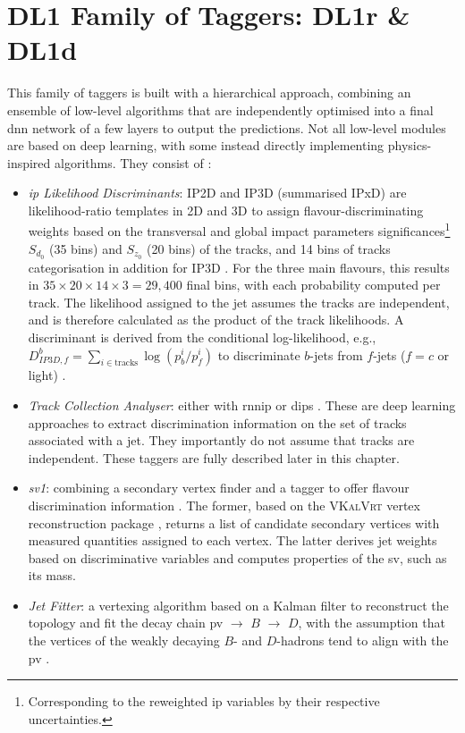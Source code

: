 \section{DL1 Family of Taggers: DL1r \& DL1d}
This family of taggers is built with a hierarchical approach, combining an ensemble of low-level algorithms that are independently optimised into a final \gls{dnn} network of a few layers to output the predictions. Not all low-level modules are based on deep learning, with some instead directly implementing physics-inspired algorithms. They consist of \cite{atlas:FTAGRUN2, Paganini:2289214}:
\begin{itemize}
  \item \textit{\gls{ip} Likelihood Discriminants}: IP2D and IP3D (summarised IPxD) are likelihood-ratio templates in 2D and 3D to assign flavour-discriminating weights based on the transversal and global impact parameters significances\footnote{Corresponding to the reweighted \gls{ip} variables by their respective uncertainties.} $S_{d_0}$ (35 bins) and $S_{z_0}$ (20 bins) of the tracks, and 14 bins of tracks categorisation in addition for IP3D \cite{ATLAS:2017bcq}. For the three main flavours, this results in $35 \times 20 \times 14 \times 3 = 29,400$ final bins, with each probability computed per track. The likelihood assigned to the jet assumes the tracks are independent, and is therefore calculated as the product of the track likelihoods. A discriminant is derived from the conditional log-likelihood, e.g., $D^b_{IP3D,f} = \sum_{i \in \textrm{tracks}} \log (p_b^i / p_f^i)$ to discriminate $b$-jets from $f$-jets ($f= c$ or light) \cite{ATL-PHYS-PUB-2015-022}.
  \item \textit{Track Collection Analyser}: either with \gls{rnnip} \cite{ATL-PHYS-PUB-2017-003} or \gls{dips} \cite{ATL-PHYS-PUB-2020-014}. These are deep learning approaches to extract discrimination information on the set of tracks associated with a jet. They importantly do not assume that tracks are independent. These taggers are fully described later in this chapter. 
  \item \textit{\gls{sv1}}: combining a secondary vertex finder and a tagger to offer flavour discrimination information \cite{atlas:FTAGRUN2}. The former, based on the \textsc{VKalVrt} vertex reconstruction package \cite{Kostyukhin:685551}, returns a list of candidate secondary vertices with measured quantities assigned to each vertex. The latter derives jet weights based on discriminative variables and computes properties of the \gls{sv}, such as its mass. 
  \item \textit{Jet Fitter}: a vertexing algorithm based on a Kalman filter to reconstruct the topology and fit the decay chain \gls{pv} $\rightarrow$ $B$ $\rightarrow$ $D$, with the assumption that the vertices of the weakly decaying $B$- and $D$-hadrons tend to align with the \gls{pv} \cite{atlas:FTAGRUN2, ATL-PHYS-PUB-2018-025}. 
\end{itemize}

